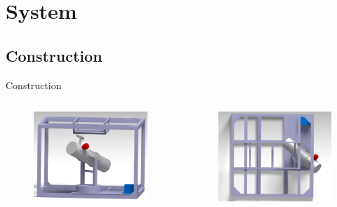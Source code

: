 \documentclass[11pt, aspectratio=169]{beamer}
\begin{document}
\section{System}
\subsection{Construction}	 	%
\begin{frame}{Construction}
\vspace{-2cm}
\begin{columns}[t]
	\begin{column}{0.3\textwidth}
		\begin{figure}
		\centering
		\includegraphics[scale=0.6]{figures/CAD/Assembly_1.png}
		\end{figure}
	\end{column}
	\begin{column}{0.3\textwidth}
		\begin{figure}
		\centering
		\includegraphics[scale=0.6]{figures/CAD/Assembly_2.png}

\end{figure}
\end{column}
\end{columns}
\end{frame}
\end{document}
